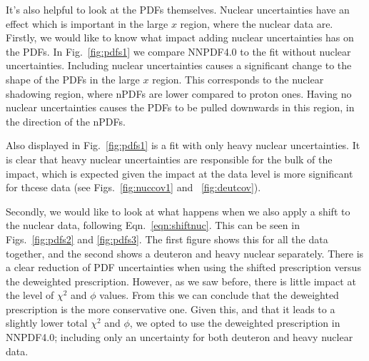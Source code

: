 It's also helpful to look at the PDFs themselves. Nuclear uncertainties have an effect which is important in the large $x$ region, where the nuclear data are. Firstly, we would like to know what impact adding nuclear uncertainties has on the PDFs. In Fig.~\ref{fig:pdfs1} we compare NNPDF4.0 to the fit without nuclear uncertainties. Including nuclear uncertainties causes a significant change to the shape of the PDFs in the large $x$ region. This corresponds to the nuclear shadowing region, where nPDFs are lower compared to proton ones. Having no nuclear uncertainties causes the PDFs to be pulled downwards in this region, in the direction of the nPDFs.

Also displayed in Fig.~\ref{fig:pdfs1} is a fit with only heavy nuclear uncertainties. It is clear that heavy nuclear uncertainties are responsible for the bulk of the impact, which is expected given the impact at the data level is more significant for thcese data (see Figs.~\ref{fig:nuccov1} and ~\ref{fig:deutcov}).

Secondly, we would like to look at what happens when we also apply a shift to the nuclear data, following Eqn.~\ref{eqn:shiftnuc}. This can be seen in Figs.~\ref{fig:pdfs2} and \ref{fig:pdfs3}. The first figure shows this for all the data together, and the second shows a deuteron and heavy nuclear separately. There is a clear reduction of PDF uncertainties when using the shifted prescription versus the deweighted prescription. However, as we saw before, there is little impact at the level of $\chi^2$ and $\phi$ values. From this we can conclude that the deweighted prescription is the more conservative one. Given this, and that it leads to a slightly lower total $\chi^2$ and $\phi$, we opted to use the deweighted prescription in NNPDF4.0; including only an uncertainty for both deuteron and heavy nuclear data.

